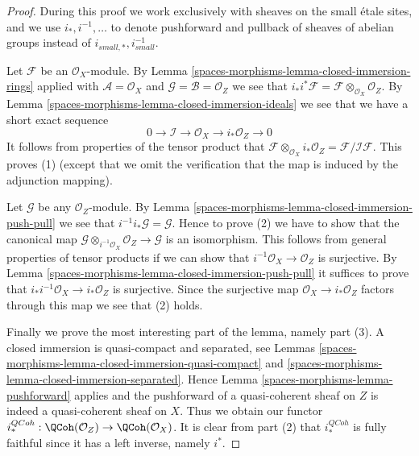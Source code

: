 \begin{proof}
During this proof we work exclusively with sheaves on
the small \'etale sites, and we use $i_*, i^{-1}, \ldots$
to denote pushforward and pullback of sheaves of abelian groups
instead of $i_{small, *}, i_{small}^{-1}$.

\medskip\noindent
Let $\mathcal{F}$ be an $\mathcal{O}_X$-module. By
Lemma \ref{spaces-morphisms-lemma-closed-immersion-rings} applied with
$\mathcal{A} = \mathcal{O}_X$ and
$\mathcal{G} = \mathcal{B} = \mathcal{O}_Z$ we see that
$i_*i^*\mathcal{F} = \mathcal{F} \otimes_{\mathcal{O}_X} \mathcal{O}_Z$.
By
Lemma \ref{spaces-morphisms-lemma-closed-immersion-ideals}
we see that we have a short exact sequence
$$
0 \to \mathcal{I} \to \mathcal{O}_X \to i_*\mathcal{O}_Z \to 0
$$
It follows from properties of the tensor product that
$\mathcal{F} \otimes_{\mathcal{O}_X} i_*\mathcal{O}_Z
= \mathcal{F}/\mathcal{I}\mathcal{F}$. This proves (1) (except
that we omit the verification that the map is induced by the
adjunction mapping).

\medskip\noindent
Let $\mathcal{G}$ be any $\mathcal{O}_Z$-module. By
Lemma \ref{spaces-morphisms-lemma-closed-immersion-push-pull}
we see that $i^{-1}i_*\mathcal{G} = \mathcal{G}$.
Hence to prove (2) we have to show that the canonical map
$\mathcal{G} \otimes_{i^{-1}\mathcal{O}_X} \mathcal{O}_Z \to \mathcal{G}$
is an isomorphism. This follows from general properties of tensor products
if we can show that $i^{-1}\mathcal{O}_X \to \mathcal{O}_Z$ is surjective. By
Lemma \ref{spaces-morphisms-lemma-closed-immersion-push-pull}
it suffices to prove that
$i_*i^{-1}\mathcal{O}_X \to i_*\mathcal{O}_Z$
is surjective. Since the surjective map $\mathcal{O}_X \to i_*\mathcal{O}_Z$
factors through this map we see that (2) holds.

\medskip\noindent
Finally we prove the most interesting part of the lemma, namely part (3).
A closed immersion is quasi-compact and separated, see
Lemmas \ref{spaces-morphisms-lemma-closed-immersion-quasi-compact} and
\ref{spaces-morphisms-lemma-closed-immersion-separated}. Hence
Lemma \ref{spaces-morphisms-lemma-pushforward}
applies and the pushforward of a quasi-coherent
sheaf on $Z$ is indeed a quasi-coherent sheaf on $X$.
Thus we obtain our functor
$i^{QCoh}_* : \QCoh(\mathcal{O}_Z)
\to \QCoh(\mathcal{O}_X)$.
It is clear from part (2) that $i^{QCoh}_*$ is fully faithful since
it has a left inverse, namely $i^*$.


\end{proof}
